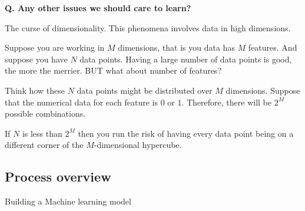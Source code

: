 \begin{frame}[fragile, label={CoD}]{\textbf{Q. Any other issues we should care to learn?}}
  \begin{wideitemize}
    \item The curse of dimensionality. This phenomena involves data in high dimensions.
    \item Suppose you are working in $M$ dimensions, that is you data has $M$
    features. And suppose you have $N$ data points. Having a large number of
    data points is good, the more the merrier. BUT what about number of features?
    \item Think how these $N$ data points might be distributed over $M$ dimensions.
    Suppose that the numerical data for each feature is $0$ or $1$. Therefore, there
    will be $2^{M}$ possible combinations.\medskip
    \begin{wideitemize}
      \item If $N$ is less than $2^{M}$ then you run the risk of having every data
      point being on a different corner of the $M$-dimensional hypercube.
    \end{wideitemize}
  \end{wideitemize}
\end{frame}

\subsection{Process overview}
\begin{transitionsubframe}
  \begin{center}
    \Huge Building a Machine learning model
  \end{center}
\end{transitionsubframe}

